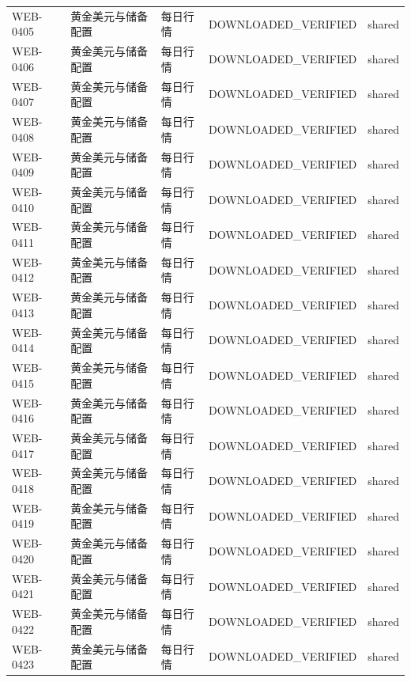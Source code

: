 \documentclass[UTF8,openany,oneside,11pt]{ctexbook}
\begin{document}
\begin{longtable}{L{1.4cm}L{2.4cm}L{6.0cm}L{3.0cm}L{1.8cm}}
WEB-\allowbreak{}0405 & 黄金美元与储备配置 & 每日行情 & DOWNLOADED\_\allowbreak{}VERIFIED & shared \\
WEB-\allowbreak{}0406 & 黄金美元与储备配置 & 每日行情 & DOWNLOADED\_\allowbreak{}VERIFIED & shared \\
WEB-\allowbreak{}0407 & 黄金美元与储备配置 & 每日行情 & DOWNLOADED\_\allowbreak{}VERIFIED & shared \\
WEB-\allowbreak{}0408 & 黄金美元与储备配置 & 每日行情 & DOWNLOADED\_\allowbreak{}VERIFIED & shared \\
WEB-\allowbreak{}0409 & 黄金美元与储备配置 & 每日行情 & DOWNLOADED\_\allowbreak{}VERIFIED & shared \\
WEB-\allowbreak{}0410 & 黄金美元与储备配置 & 每日行情 & DOWNLOADED\_\allowbreak{}VERIFIED & shared \\
WEB-\allowbreak{}0411 & 黄金美元与储备配置 & 每日行情 & DOWNLOADED\_\allowbreak{}VERIFIED & shared \\
WEB-\allowbreak{}0412 & 黄金美元与储备配置 & 每日行情 & DOWNLOADED\_\allowbreak{}VERIFIED & shared \\
WEB-\allowbreak{}0413 & 黄金美元与储备配置 & 每日行情 & DOWNLOADED\_\allowbreak{}VERIFIED & shared \\
WEB-\allowbreak{}0414 & 黄金美元与储备配置 & 每日行情 & DOWNLOADED\_\allowbreak{}VERIFIED & shared \\
WEB-\allowbreak{}0415 & 黄金美元与储备配置 & 每日行情 & DOWNLOADED\_\allowbreak{}VERIFIED & shared \\
WEB-\allowbreak{}0416 & 黄金美元与储备配置 & 每日行情 & DOWNLOADED\_\allowbreak{}VERIFIED & shared \\
WEB-\allowbreak{}0417 & 黄金美元与储备配置 & 每日行情 & DOWNLOADED\_\allowbreak{}VERIFIED & shared \\
WEB-\allowbreak{}0418 & 黄金美元与储备配置 & 每日行情 & DOWNLOADED\_\allowbreak{}VERIFIED & shared \\
WEB-\allowbreak{}0419 & 黄金美元与储备配置 & 每日行情 & DOWNLOADED\_\allowbreak{}VERIFIED & shared \\
WEB-\allowbreak{}0420 & 黄金美元与储备配置 & 每日行情 & DOWNLOADED\_\allowbreak{}VERIFIED & shared \\
WEB-\allowbreak{}0421 & 黄金美元与储备配置 & 每日行情 & DOWNLOADED\_\allowbreak{}VERIFIED & shared \\
WEB-\allowbreak{}0422 & 黄金美元与储备配置 & 每日行情 & DOWNLOADED\_\allowbreak{}VERIFIED & shared \\
WEB-\allowbreak{}0423 & 黄金美元与储备配置 & 每日行情 & DOWNLOADED\_\allowbreak{}VERIFIED & shared \\

\end{longtable}
\end{document}

